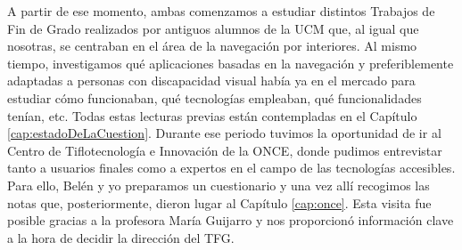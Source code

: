 A partir de ese momento, ambas comenzamos a estudiar distintos Trabajos de Fin de Grado realizados por antiguos alumnos de la UCM que, al igual que nosotras, se centraban en el área de la navegación por interiores. Al mismo tiempo, investigamos qué aplicaciones basadas en la navegación y preferiblemente adaptadas a personas con discapacidad visual había ya en el mercado para estudiar cómo funcionaban, qué tecnologías empleaban, qué funcionalidades tenían, etc. Todas estas lecturas previas están contempladas en el Capítulo \ref{cap:estadoDeLaCuestion}. Durante ese periodo tuvimos la oportunidad de ir al Centro de Tiflotecnología e Innovación de la ONCE, donde pudimos entrevistar tanto a usuarios finales como a expertos en el campo de las tecnologías accesibles. Para ello, Belén y yo preparamos un cuestionario y una vez allí recogimos las notas que, posteriormente, dieron lugar al Capítulo \ref{cap:once}. Esta visita fue posible gracias a la profesora María Guijarro y nos proporcionó información clave a la hora de decidir la dirección del TFG.

